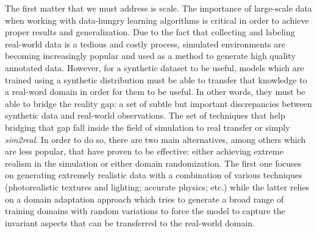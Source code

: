 The first matter that we must address is scale. The importance of large-scale data when working with data-hungry learning algorithms is critical in order to achieve proper results and generalization. Due to the fact that collecting and labeling real-world data is a tedious and costly process, simulated environments are becoming increasingly popular and used as a method to generate high quality annotated data. However, for a synthetic dataset to be useful, models which are trained using a synthetic distribution must be able to transfer that knowledge to a real-word domain in order for them to be useful. In other words, they must be able to bridge the reality gap: a set of subtle but important discrepancies between synthetic data and real-world observations. The set of techniques that help bridging that gap fall inside the field of simulation to real transfer or simply \emph{sim2real}. In order to do so, there are two main alternatives, among others which are less popular, that have proven to be effective: either achieving extreme realism in the simulation or either domain randomization. The first one focuses on generating extremely realistic data with a combination of various techniques (photorealistic textures and lighting; accurate physics; etc.) while the latter relies on a domain adaptation approach which tries to generate a broad range of training domains with random variations to force the model to capture the invariant aspects that can be transferred to the real-world domain. 

\clearpage

